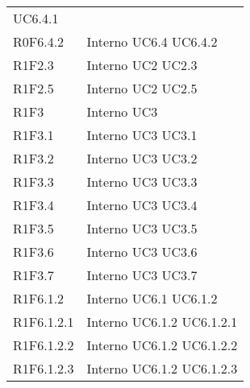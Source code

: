 \begin{longtable}{p{2.5cm}!{\VRule[1pt]}p{2.5cm}}
 \newline UC6.4.1
 \\
R0F6.4.2 & Interno \newline UC6.4
 \newline UC6.4.2
 \\
R1F2.3 & Interno \newline UC2
 \newline UC2.3
 \\
R1F2.5 & Interno \newline UC2
 \newline UC2.5
 \\
R1F3 & Interno \newline UC3
 \\
R1F3.1 & Interno \newline UC3
 \newline UC3.1
 \\
R1F3.2 & Interno \newline UC3
 \newline UC3.2
 \\
R1F3.3 & Interno \newline UC3
 \newline UC3.3
 \\
R1F3.4 & Interno \newline UC3
 \newline UC3.4
 \\
R1F3.5 & Interno \newline UC3
 \newline UC3.5
 \\
R1F3.6 & Interno \newline UC3
 \newline UC3.6
 \\
R1F3.7 & Interno \newline UC3
 \newline UC3.7
 \\
R1F6.1.2 & Interno \newline UC6.1
 \newline UC6.1.2
 \\
R1F6.1.2.1 & Interno \newline UC6.1.2
 \newline UC6.1.2.1
 \\
R1F6.1.2.2 & Interno \newline UC6.1.2
 \newline UC6.1.2.2
 \\
R1F6.1.2.3 & Interno \newline UC6.1.2
 \newline UC6.1.2.3
 \\

\end{longtable}
